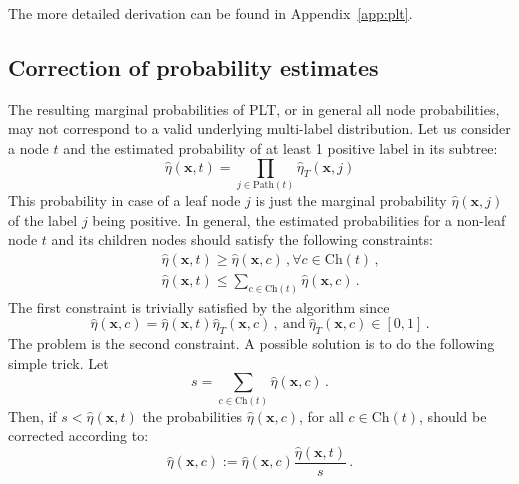 \documentclass{article}
\newcommand{\Algo}[1]{\textsc{#1}}
\renewcommand{\vec}[1]{\boldsymbol{#1}}
\newcommand{\bx}{\vec{x}}
\newcommand{\heta}{\hat{\eta}}
\newcommand{\pa}[1]{\mathrm{pa}(#1)}
\newcommand{\Path}[1]{\mathrm{Path}(#1)}
\newcommand{\Children}[1]{\mathrm{Ch}(#1)}
\newcommand{\sectionBefore}{-0pt}
\newcommand{\sectionAfter}{-0pt}
\begin{document}
The more detailed derivation can be found in Appendix~\ref{app:plt}.  

\vspace{\sectionBefore}
\subsection{Correction of probability estimates}
\label{sec:correction}
\vspace{\sectionAfter}

The resulting marginal probabilities of PLT, or in general all node probabilities, may not correspond to a valid underlying multi-label distribution. Let us consider a node $t$ and the estimated probability of at least 1 positive label in its subtree: 
$$
\heta(\bx, t) = \prod_{j \in \Path{t}} \heta_T(\bx, j)
$$
This probability in case of a leaf node $j$ is just the marginal probability $\heta(\bx, j)$ of the label $j$ being positive.
In general, the estimated probabilities for a non-leaf node $t$ and its children nodes should satisfy the following constraints: 
\begin{eqnarray*}
&& \heta(\bx, t)  \ge \heta(\bx, c)\,, \forall c \in \Children{t}\,, \\
&& \heta(\bx, t)  \le \sum_{c \in \Children{t}}  \heta(\bx, c) \,. 
\end{eqnarray*}
The first constraint is trivially satisfied by the algorithm since 
$$
\heta(\bx, c) = \heta(\bx, t) \heta_T(\bx, c)\,,\mathrm{~and~}  \heta_T(\bx, c) \in [0,1]\,.
$$ 
The problem is the second constraint. A possible solution is to do the following simple trick. Let 
$$
s = \sum_{c \in \Children{t}} \heta(\bx, c) \,.
$$
Then, if $s < \heta(\bx, t)$ the probabilities $\heta(\bx, c)$, for all $c \in \Children{t}$, should be corrected according to:
$$
\heta(\bx, c) := \heta(\bx, c) \frac{\heta(\bx, t)}{s}\,.
$$

\end{document}
